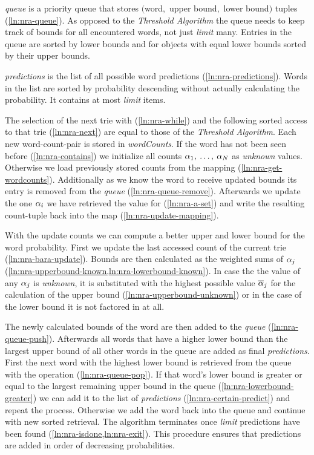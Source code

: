 \emph{queue} is a priority queue that stores $($word$,$ upper
bound$,$ lower bound$)$ tuples (\cref{ln:nra-queue}).
As opposed to the \emph{Threshold Algorithm} the queue needs to keep track of
bounds for all encountered words, not just \emph{limit} many.
Entries in the queue are sorted by lower bounds and for objects with equal
lower bounds sorted by their upper bounds.

\emph{predictions} is the list of all possible word predictions
(\cref{ln:nra-predictions}).
Words in the list are sorted by probability descending without actually
calculating the probability.
It contains at most \emph{limit} items.

The selection of the next trie with  (\cref{ln:nra-while})
and the following sorted access to that trie (\cref{ln:nra-next}) are equal
to those of the \emph{Threshold Algorithm}.
Each new word-count-pair is stored in \emph{wordCounts}.
If the word has not been seen before (\cref{ln:nra-contains}) we initialize all
counts $\alpha_1, \: \ldots, \: \alpha_N$ as \emph{unknown} values.
Otherwise we load previously stored counts from the mapping
(\cref{ln:nra-get-wordcounts}).
Additionally as we know the word to receive updated bounds its entry is removed
from the \emph{queue} (\cref{ln:nra-queue-remove}).
Afterwards we update the one $\alpha_i$ we have retrieved the value for
(\cref{ln:nra-a-set}) and write the resulting count-tuple back into the map
(\cref{ln:nra-update-mapping}).

With the update counts we can compute a better upper and lower bound for the
word probability.
First we update the last accessed count of the current trie
(\cref{ln:nra-bara-update}).
Bounds are then calculated as the weighted sums of $\alpha_j$
(\cref{ln:nra-upperbound-known,ln:nra-lowerbound-known}).
In case the the value of any $\alpha_j$ is \emph{unknown}, it is  substituted
with the highest possible value $\overline{\alpha}_j$ for the calculation of
the upper bound (\cref{ln:nra-upperbound-unknown}) or in the case of the lower
bound it is not factored in at all.

The newly calculated bounds of the word are then added to the \emph{queue}
(\cref{ln:nra-queue-push}).
Afterwards all words that have a higher lower bound than the largest
upper bound of all other words in the queue are added as final
\emph{predictions}.
First the next word with the highest lower bound is retrieved from the queue
with the  operation (\cref{ln:nra-queue-pop}).
If that word's lower bound is greater or equal to the largest remaining upper
bound in the queue (\cref{ln:nra-lowerbound-greater}) we can add it to the list
of \emph{predictions} (\cref{ln:nra-certain-predict}) and repeat the process.
Otherwise we add the word back into the queue and continue with new sorted
retrieval.
The algorithm terminates once \emph{limit} predictions have been found
(\cref{ln:nra-isdone,ln:nra-exit}).
This procedure ensures that predictions are added in order of decreasing
probabilities.

